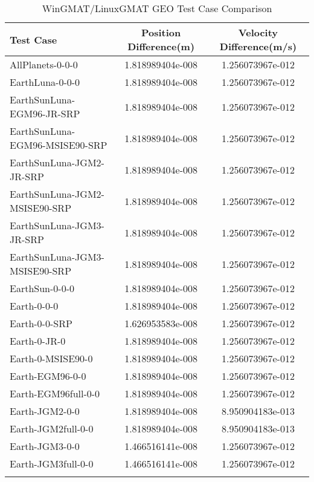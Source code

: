 \begin{table}[htbp!]
\centering
\caption{ WinGMAT/LinuxGMAT GEO Test Case Comparison}
      \begin{tabular}{lcc}
      \hline\hline
          Test Case & Position Difference(m) & Velocity Difference(m/s) \\
         \hline
         AllPlanets-0-0-0 & 1.818989404e-008 & 1.256073967e-012 \\
         EarthLuna-0-0-0 & 1.818989404e-008 & 1.256073967e-012 \\
         EarthSunLuna-EGM96-JR-SRP & 1.818989404e-008 & 1.256073967e-012 \\
         EarthSunLuna-EGM96-MSISE90-SRP & 1.818989404e-008 & 1.256073967e-012 \\
         EarthSunLuna-JGM2-JR-SRP & 1.818989404e-008 & 1.256073967e-012 \\
         EarthSunLuna-JGM2-MSISE90-SRP & 1.818989404e-008 & 1.256073967e-012 \\
         EarthSunLuna-JGM3-JR-SRP & 1.818989404e-008 & 1.256073967e-012 \\
         EarthSunLuna-JGM3-MSISE90-SRP & 1.818989404e-008 & 1.256073967e-012 \\
         EarthSun-0-0-0 & 1.818989404e-008 & 1.256073967e-012 \\
         Earth-0-0-0 & 1.818989404e-008 & 1.256073967e-012 \\
         Earth-0-0-SRP & 1.626953583e-008 & 1.256073967e-012 \\
         Earth-0-JR-0 & 1.818989404e-008 & 1.256073967e-012 \\
         Earth-0-MSISE90-0 & 1.818989404e-008 & 1.256073967e-012 \\
         Earth-EGM96-0-0 & 1.818989404e-008 & 1.256073967e-012 \\
         Earth-EGM96full-0-0 & 1.818989404e-008 & 1.256073967e-012 \\
         Earth-JGM2-0-0 & 1.818989404e-008 & 8.950904183e-013 \\
         Earth-JGM2full-0-0 & 1.818989404e-008 & 8.950904183e-013 \\
         Earth-JGM3-0-0 & 1.466516141e-008 & 1.256073967e-012 \\
         Earth-JGM3full-0-0 & 1.466516141e-008 & 1.256073967e-012 \\
      \hline\hline
      \label{Table: GEO WinGMAT-LinuxGMAT Table} 
\end{tabular}
\end{table}
